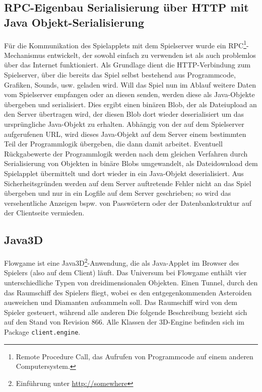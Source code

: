 \documentclass[a4paper,12pt]{scrartcl}
\begin{document}
\subsection{RPC-Eigenbau Serialisierung über HTTP mit Java
Objekt-Serialisierung}
Für die Kommunikation des Spielapplets mit dem
Spielserver wurde ein RPC\footnote{Remote Procedure Call, das Aufrufen von
Programmcode auf einem anderen Computersystem.}-Mecha\-nismus entwickelt, der
sowohl einfach zu verwenden ist als auch problemlos über das Internet funktioniert. Als Grundlage dient die HTTP-Verbindung zum Spielserver, über die bereits
das Spiel selbst bestehend aus Programmcode, Grafiken, Sounds, usw. geladen wird.
Will das Spiel nun im Ablauf weitere Daten vom Spielserver empfangen oder an diesen
senden, werden diese als Java-Objekte übergeben und serialisiert. Dies ergibt einen binären
Blob, der als Dateiupload an den Server übertragen wird, der diesen Blob dort wieder
deserialisiert um das ursprüngliche Java-Objekt zu erhalten. Abhängig von der auf dem
Spielserver aufgerufenen URL, wird dieses Java-Objekt auf dem Server einem bestimmten
Teil der Programmlogik übergeben, die dann damit arbeitet. Eventuell Rückgabewerte der
Programmlogik werden nach dem gleichen Verfahren durch Serialisierung von Objekten
in binäre Blobs umgewandelt, als Dateidownload dem Spielapplet übermittelt und dort
wieder in ein Java-Objekt deserialisiert. Aus Sicherheitsgründen werden auf dem Server
auftretende Fehler nicht an das Spiel übergeben und nur in ein Logfile auf dem Server
geschrieben; so wird das versehentliche Anzeigen bspw. von Passwörtern oder der
Datenbankstruktur auf der Clientseite vermieden.

\subsection{Java3D}
Flowgame ist eine Java3D\footnote{Einführung unter
\url{http://somewhere}}-Anwendung, die als Java-Applet im Browser des Spielers
(also auf dem Client) läuft. Das Universum bei Flowgame enthält vier unterschiedliche Typen von dreidimensionalen Objekten. Einen Tunnel, durch den das Raumschiff des Spielers fliegt,
wobei es den entgegenkommenden Asteroiden ausweichen und Diamanten aufsammeln
soll. Das Raumschiff wird von dem Spieler gesteuert, während alle anderen
Die folgende Beschreibung bezieht sich auf den Stand von Revision 866.
Alle Klassen der 3D-Engine befinden sich im Package \texttt{client.engine}.
\end{document}
